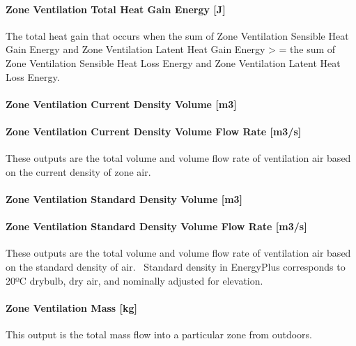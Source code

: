 \paragraph{Zone Ventilation Total Heat Gain Energy {[}J{]}}\label{zone-ventilation-total-heat-gain-energy-j}

The total heat gain that occurs when the sum of Zone Ventilation Sensible Heat Gain Energy and Zone Ventilation Latent Heat Gain Energy \textgreater{} = the sum of Zone Ventilation Sensible Heat Loss Energy and Zone Ventilation Latent Heat Loss Energy.

\paragraph{Zone Ventilation Current Density Volume {[}m3{]}}\label{zone-ventilation-current-density-volume-m3}

\paragraph{Zone Ventilation Current Density Volume Flow Rate {[}m3/s{]}}\label{zone-ventilation-current-density-volume-flow-rate-m3s}

These outputs are the total volume and volume flow rate of ventilation air based on the current density of zone air.

\paragraph{Zone Ventilation Standard Density Volume {[}m3{]}}\label{zone-ventilation-standard-density-volume-m3}

\paragraph{Zone Ventilation Standard Density Volume Flow Rate {[}m3/s{]}}\label{zone-ventilation-standard-density-volume-flow-rate-m3s}

These outputs are the total volume and volume flow rate of ventilation air based on the standard density of air.~ Standard density in EnergyPlus corresponds to 20ºC drybulb, dry air, and nominally adjusted for elevation.

\paragraph{Zone Ventilation Mass {[}kg{]}}\label{zone-ventilation-mass-kg}

This output is the total mass flow into a particular zone from outdoors.

